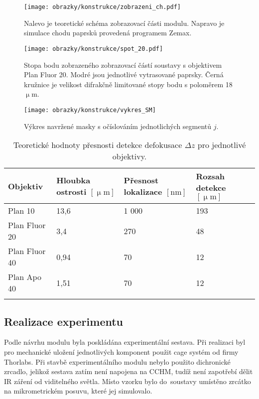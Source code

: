 \documentclass[12pt, a4paper, twoside]{article}
\begin{document}
\begin{figure}[t]
  \centering
  \texttt{[image: obrazky/konstrukce/zobrazeni\_ch.pdf]}
  \caption[Schéma a simulace chodu paprsků osvětlovací částí.]{Nalevo je teoretické schéma zobrazovací části modulu. Napravo je simulace chodu paprsků provedená programem Zemax.}
  \label{fig:zobr_zem}
\end{figure}

\begin{figure}[t]\centering
  \texttt{[image: obrazky/konstrukce/spot\_20.pdf]}
  \caption[Stopa bodu zobrazeného zobrazovací částí soustavy.]{Stopa bodu zobrazeného zobrazovací částí soustavy s objektivem Plan Fluor 20. Modré jsou jednotlivé vytrasované paprsky. Černá kružnice je velikost difrakčně limitované stopy bodu s poloměrem 18 $\upmu$m. }
  \label{fig:spot_20}
\end{figure}

\begin{figure}[t]
  \centering
  \texttt{[image: obrazky/konstrukce/vykres\_SM]}
  \caption{Výkres navržené masky s očíslováním jednotlichých segmentů $j$.}
  \label{fig:vykres_masky}
\end{figure}


\begin{table}[]
  \caption{Teoretické hodnoty přesnosti detekce defokusace $\Delta z$ pro jednotlivé objektivy.}
  \centering
  \begin{tabular}{lp{2.7cm}p{2.7cm}p{2.7cm}}
    \toprule
    Objektiv& Hloubka ostrosti $[\upmu\mathrm{m}]$& Přesnost lokalizace $[\mathrm{nm}]$& Rozsah detekce $[\upmu\mathrm{m}]$\\
    \midrule
    Plan 10&13,6& 1 000 &193\\
    Plan Fluor 20&3,4&270&48\\
    Plan Fluor 40&0,94&70&12\\
    Plan Apo 40&1,51&70&12\\
    \bottomrule\\
  \end{tabular}
  \label{tab:presnost}
\end{table}
\cleardoublepage

\subsection*{Realizace experimentu}
Podle návrhu modulu byla poskládána experimentální sestava. Při realizaci byl pro mechanické uložení jednotlivých komponent použit cage systém od firmy Thorlabs. Při stavbě experimentálního modulu nebylo použito dichronické zrcadlo, jelikož sestava zatím není napojena na CCHM, tudíž není zapotřebí dělit IR záření od viditelného světla. Místo vzorku bylo do~soustavy umístěno zrcátko na mikrometrickém posuvu, které jej simulovalo.
\end{document}
